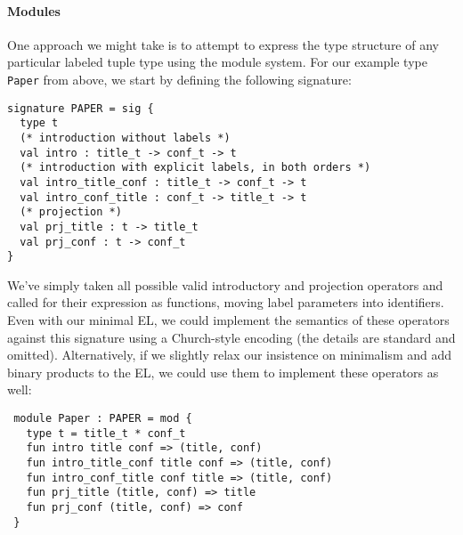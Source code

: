 \paragraph{Modules}
One approach we might take is to attempt to express the type structure of any particular labeled tuple type using the module system.  %
For our example type \lstinline{Paper} from above, we start by defining the following signature:
\begin{lstlisting}
signature PAPER = sig {
  type t
  (* introduction without labels *)
  val intro : title_t -> conf_t -> t
  (* introduction with explicit labels, in both orders *)
  val intro_title_conf : title_t -> conf_t -> t
  val intro_conf_title : conf_t -> title_t -> t
  (* projection *)
  val prj_title : t -> title_t
  val prj_conf : t -> conf_t
}
\end{lstlisting}
We've simply taken all possible valid introductory and projection operators and called for their expression as  functions, moving label parameters into identifiers. Even with our minimal EL, we could  implement the semantics of these operators against this signature using a Church-style encoding (the details are standard and omitted). Alternatively, if we slightly relax  our insistence on minimalism and add binary products to the EL, we could use them to implement these operators as well:
\begin{lstlisting}
 module Paper : PAPER = mod {
   type t = title_t * conf_t
   fun intro title conf => (title, conf)
   fun intro_title_conf title conf => (title, conf)
   fun intro_conf_title conf title => (title, conf)
   fun prj_title (title, conf) => title 
   fun prj_conf (title, conf) => conf
 }
 \end{lstlisting}

